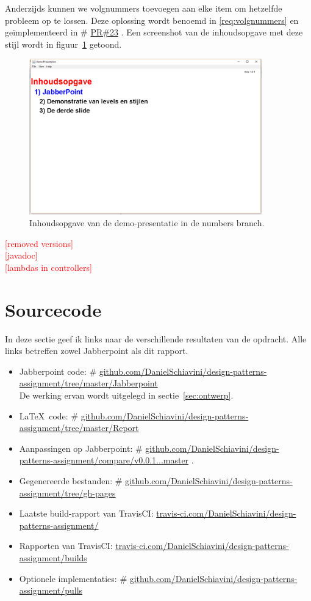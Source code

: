 \documentclass[a4paper]{article}
\makeatletter
\newcommand{\todo}[1]{\textcolor{red}{[#1]}\\}
\newcommand*{\repo}{\begingroup\@makeother\#\@repo}
\newcommand*{\@repo}[2]{%
  \href{https://github.com/DanielSchiavini/design-patterns-assignment/#1}{#2}%
  \endgroup}
\newcommand{\PR}[1]{\repo{pull/#1}{PR\##1}}
\newcommand{\repolink}[1]{\repo{#1}{github.com\-/Daniel\-Schiavini\-/de\-sign-\-pat\-terns-\-as\-sign\-ment\-/#1}}
\newcommand{\cilink}[1]{\href{https://travis-ci.com/DanielSchiavini/design-patterns-assignment/#1}{travis-ci.com/DanielSchiavini/design-patterns-assignment/#1}}
\newcommand{\reqref}[1]{\ref{req:#1}}
\makeatother
\begin{document}
    Anderzijds kunnen we volgnummers toevoegen aan elke item om hetzelfde probleem op te lossen.
    Deze oplossing wordt benoemd in \reqref{volgnummers} en ge\-ïmple\-men\-teerd in \PR{23}.
    Een screenshot van de inhoudsopgave met deze stijl wordt in figuur~\ref{fig:numbers} getoond.
    \begin{figure}[!htb]
     \caption{
        Inhoudsopgave van de demo-presentatie in de numbers branch.\label{fig:numbers}
     }
     \centering \includegraphics[width=0.9\textwidth]{Screenshots/numbers.png}
    \end{figure}
    
    \todo{removed versions}
    \todo{javadoc}
    \todo{lambdas in controllers}
    
\section{Sourcecode}
In deze sectie geef ik links naar de verschillende resultaten van de opdracht.
Alle links betreffen zowel Jabberpoint als dit rapport.
\begin{itemize}
    \item Jabberpoint code:
        \repolink{tree/master/Jabberpoint}\\
        De werking ervan wordt uitgelegd in sectie~\ref{sec:ontwerp}.
    \item \LaTeX ~code:
        \repo{tree/master/Report}{github.com/DanielSchiavini/design-patterns-assignment/tree\-/master\-/Report}
    \item Aanpassingen op Jabberpoint:
        \repolink{compare/v0.0.1...master}.
    \item Gegenereerde bestanden:
        \repolink{tree/gh-pages}
    \item Laatste build-rapport van TravisCI:
        \cilink{}
    \item Rapporten van TravisCI:
        \cilink{builds}
    \item Optionele implementaties:
        \repolink{pulls}
\end{itemize}
\end{document}
